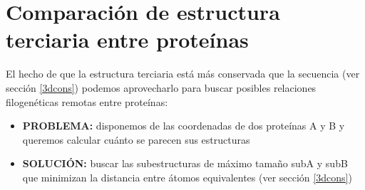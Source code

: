 \section{Comparaci\'{o}n de estructura terciaria entre prote\'{i}nas} \label{compS3}

El hecho de que la estructura terciaria est\'{a} m\'{a}s conservada que la secuencia (ver secci\'{o}n \ref{3dcons})
podemos aprovecharlo para buscar posibles relaciones filogen\'{e}ticas remotas entre prote\'{i}nas:

\begin{itemize}
\item \textbf{PROBLEMA:} disponemos de las coordenadas de dos prote\'{i}nas A y B y queremos calcular cu\'{a}nto se parecen sus estructuras
\item \textbf{SOLUCI\'{O}N:} buscar las subestructuras de m\'{a}ximo tama\~no subA y subB que minimizan la distancia entre \'{a}tomos equivalentes 
(ver secci\'{o}n \ref{3dcons})
\end{itemize}

